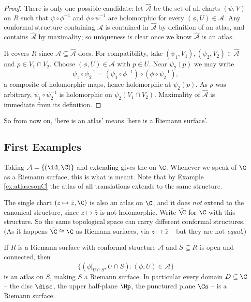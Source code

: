 \begin{proof}
	There is only one possible candidate: let $\hat{\mathcal{A}}$ be the set of all charts
	$(\psi, V)$ on $R$ such that $\psi \circ \phi^{-1}$ and $\phi \circ \psi^{-1}$ are
	holomorphic for every $(\phi, U) \in \mathcal{A}$. Any conformal structure containing
	$\mathcal{A}$ is contained in $\hat{\mathcal{A}}$ by definition of an atlas, and
	contains $\hat{\mathcal{A}}$ by maximality; so uniqueness is clear once we know
	$\hat{\mathcal{A}}$ is an atlas.

	It covers $R$ since $\mathcal{A} \subseteq \hat{\mathcal{A}}$ does. For compatibility,
	take $(\psi_1, V_1), (\psi_2, V_2) \in \hat{\mathcal{A}}$ and $p \in V_1 \cap V_2$.
	Choose $(\phi, U) \in \mathcal{A}$ with $p \in U$. Near $\psi_2(p)$ we may write
	$$
	\psi_1 \circ \psi_2^{-1} = (\psi_1 \circ \phi^{-1}) \circ (\phi \circ \psi_2^{-1}),
	$$
	a composite of holomorphic maps, hence holomorphic at $\psi_2(p)$. As $p$ was
	arbitrary, $\psi_1 \circ \psi_2^{-1}$ is holomorphic on $\psi_2(V_1 \cap V_2)$.
	Maximality of $\hat{\mathcal{A}}$ is immediate from its definition.
\end{proof}

So from now on, `here is an atlas' means `here is a Riemann surface'.

\subsection{First Examples}

\begin{example}
	Taking $\mathcal{A} = \{(\id, \C)\}$ and extending gives the  on $\C$. Whenever we speak of $\C$ as a Riemann surface, this is
	what is meant. Note that by Example \ref{ex:atlasesonC} the atlas of all translations
	extends to the same structure.
\end{example}

\begin{example}
	The single chart $(z \mapsto \bar z, \C)$ is also an atlas on $\C$, and it does
	\emph{not} extend to the canonical structure, since $z \mapsto \bar z$ is not
	holomorphic. Write $\bar\C$ for $\C$ with this structure. So the same topological
	space can carry different conformal structures. (As it happens $\bar \C \cong \C$ as
	Riemann surfaces, via $z \mapsto \bar z$ -- but they are not \emph{equal}.)
\end{example}

\begin{example}\label{ex:opensubset}
	If $R$ is a Riemann surface with conformal structure $\mathcal{A}$ and
	$S \subseteq R$ is open and connected, then
	$$
	\{ (\phi|_{U \cap S}, U \cap S) : (\phi, U) \in \mathcal{A} \}
	$$
	is an atlas on $S$, making $S$ a Riemann surface. In particular every domain
	$D \subseteq \C$ -- the disc $\disc$, the upper half-plane $\Hp$, the punctured plane
	$\Cs$ -- is a Riemann surface.
\end{example}

